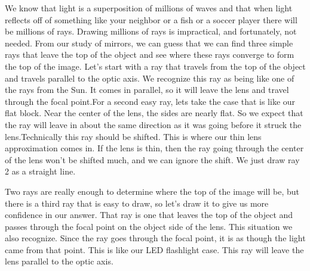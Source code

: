 \documentclass{article}
\begin{document}
We know that light is a superposition of millions of waves and that when
light reflects off of something like your neighbor or a fish or a soccer
player there will be millions of rays. Drawing millions of rays is
impractical, and fortunately, not needed. From our study of mirrors, we can
guess that we can find three simple rays that leave the top of the object
and see where these rays converge to form the top of the image. Let's start
with a ray that travels from the top of the object and travels parallel to
the optic axis. We recognize this ray as being like one of the rays from the
Sun. It comes in parallel, so it will leave the lens and travel through the
focal point.For a second easy ray, lets take
the case that is like our flat block. Near the center of the lens, the sides
are nearly flat. So we expect that the ray will leave in about the same
direction as it was going before it struck the lens.Technically this ray should be
shifted. This is where our thin lens approximation comes in. If the lens is
thin, then the ray going through the center of the lens won't be shifted
much, and we can ignore the shift. We just draw ray 2 as a straight line.

Two rays are really enough to determine where the top of the image will be,
but there is a third ray that is easy to draw, so let's draw it to give us
more confidence in our answer. That ray is one that leaves the top of the
object and passes through the focal point on the object side of the lens.
This situation we also recognize. Since the ray goes through the focal
point, it is as though the light came from that point. This is like our LED
flashlight case. This ray will leave the lens parallel to the optic axis.
\end{document}
